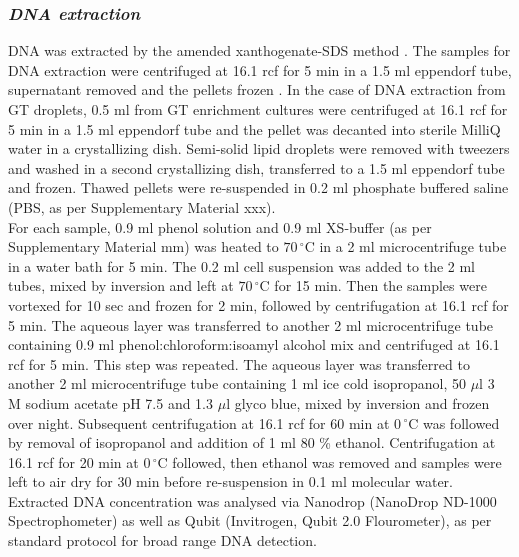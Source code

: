 \documentclass[11pt]{article}
\begin{document}
\subsubsection{\emph{DNA extraction}}
DNA was extracted by the amended xanthogenate-SDS method \cite{tillett2000xanthogenate}. The samples for DNA extraction were centrifuged at 16.1 rcf for 5 min in a 1.5 ml eppendorf tube, supernatant removed and the pellets frozen . In the case of DNA extraction from GT droplets, 0.5 ml from GT enrichment cultures were centrifuged at 16.1 rcf for 5 min in a 1.5 ml eppendorf tube and the pellet was decanted into sterile MilliQ water in a crystallizing dish. Semi-solid lipid droplets were removed with tweezers and washed in a second crystallizing dish, transferred to a 1.5 ml eppendorf tube and frozen. Thawed pellets were re-suspended in 0.2 ml phosphate buffered saline (PBS, as per Supplementary Material xxx).\\


For each sample, 0.9 ml phenol solution and 0.9 ml XS-buffer (as per Supplementary Material mm) was  heated to $70\,^{\circ}\mathrm{C}$ in a 2 ml microcentrifuge tube in a water bath for 5 min. The 0.2 ml cell suspension was added to the 2 ml tubes, mixed by inversion and left at $70\,^{\circ}\mathrm{C}$ for 15 min. Then the samples were vortexed for 10 sec and frozen for 2 min, followed by centrifugation at 16.1 rcf for 5 min. The aqueous layer was transferred to another 2 ml microcentrifuge tube containing 0.9 ml phenol:chloroform:isoamyl alcohol mix and centrifuged at 16.1 rcf for 5 min. This step was repeated. The aqueous layer was transferred to another 2 ml microcentrifuge tube containing 1 ml ice cold isopropanol, 50 $\mu$l 3 M sodium acetate pH 7.5 and 1.3 $\mu$l glyco blue, mixed by inversion and frozen over night. Subsequent centrifugation at 16.1 rcf for 60 min at $0\,^{\circ}\mathrm{C}$ was followed by removal of isopropanol and addition of 1 ml 80 \% ethanol. Centrifugation at 16.1 rcf for 20 min at $0\,^{\circ}\mathrm{C}$ followed, then ethanol was removed and samples were left to air dry for 30 min before re-suspension in 0.1 ml molecular water.
\\ 
Extracted DNA concentration was analysed via Nanodrop (NanoDrop ND-1000 Spectrophometer) as well as Qubit (Invitrogen, Qubit 2.0 Flourometer), as per standard protocol for broad range DNA detection.
\end{document}
